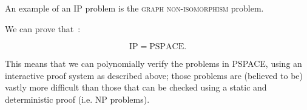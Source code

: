 An example of an IP problem is the \textsc{graph non-isomorphism} problem.

We can prove that~\cite{ipequalspspace}:
\begin{theorem}
    \begin{equation}
 \text{IP} = \text{PSPACE}.
    \end{equation}
\end{theorem}

This means that we can polynomially verify the problems in PSPACE, using an interactive proof system as described above; those problems are (believed to be) vastly more difficult than those that can be checked using a static and deterministic proof (i.e. NP problems).


